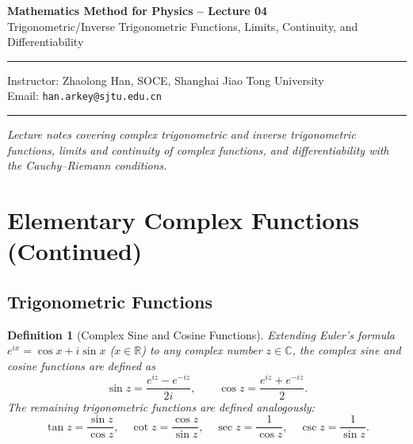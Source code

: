 \documentclass[11pt,a4paper]{article}
\theoremstyle{breakdef}
\newtheorem{definition}{Definition}
\theoremstyle{breakthm}
\begin{document}
\begin{center}
    {\LARGE \textbf{Mathematics Method for Physics -- Lecture 04}} \\[0.6em]
    {\large Trigonometric/Inverse Trigonometric Functions, Limits, Continuity, and Differentiability}
\end{center}

\vspace{-0.3em}
\noindent\rule{\textwidth}{0.5pt}
\vspace{0.2em}

\begin{center}
    Instructor: Zhaolong Han, SOCE, Shanghai Jiao Tong University \\
    Email: \texttt{han.arkey@sjtu.edu.cn}
\end{center}

\vspace{0.2em}
\noindent\rule{\textwidth}{0.5pt}

\vspace{0.6em}
\noindent \textit{Lecture notes covering complex trigonometric and inverse trigonometric functions, limits and continuity of complex functions, and differentiability with the Cauchy--Riemann conditions.}

\vspace{1.0em}

\section{Elementary Complex Functions (Continued)}

\subsection{Trigonometric Functions}

\begin{definition}[Complex Sine and Cosine Functions]
Extending Euler's formula $e^{ix} = \cos x + i\sin x$ ($x \in \mathbb{R}$) to any complex number $z \in \mathbb{C}$, the complex sine and cosine functions are defined as
\[
    \sin z = \frac{e^{iz} - e^{-iz}}{2i}, \qquad \cos z = \frac{e^{iz} + e^{-iz}}{2}.
\]
The remaining trigonometric functions are defined analogously:
\[
    \tan z = \frac{\sin z}{\cos z}, \quad \cot z = \frac{\cos z}{\sin z}, \quad \sec z = \frac{1}{\cos z}, \quad \csc z = \frac{1}{\sin z}.
\]
\end{definition}
\end{document}
